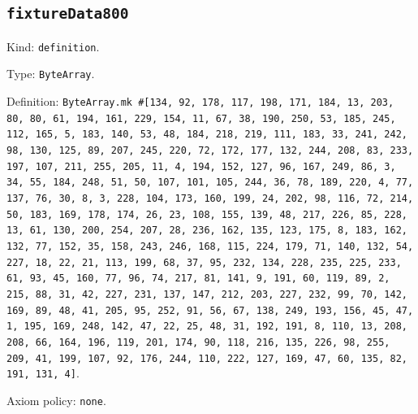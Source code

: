 \documentclass[11pt]{article}
\begin{document}
\subsection*{\texttt{fixtureData800}}
\noindent Kind: \texttt{definition}.\par
\noindent Type: \texttt{ByteArray}.\par
\noindent Definition: \texttt{ByteArray.mk \#[134, 92, 178, 117, 198, 171, 184, 13, 203, 80, 80, 61, 194, 161, 229, 154, 11, 67, 38, 190, 250, 53, 185, 245, 112, 165, 5, 183, 140, 53, 48, 184, 218, 219, 111, 183, 33, 241, 242, 98, 130, 125, 89, 207, 245, 220, 72, 172, 177, 132, 244, 208, 83, 233, 197, 107, 211, 255, 205, 11, 4, 194, 152, 127, 96, 167, 249, 86, 3, 34, 55, 184, 248, 51, 50, 107, 101, 105, 244, 36, 78, 189, 220, 4, 77, 137, 76, 30, 8, 3, 228, 104, 173, 160, 199, 24, 202, 98, 116, 72, 214, 50, 183, 169, 178, 174, 26, 23, 108, 155, 139, 48, 217, 226, 85, 228, 13, 61, 130, 200, 254, 207, 28, 236, 162, 135, 123, 175, 8, 183, 162, 132, 77, 152, 35, 158, 243, 246, 168, 115, 224, 179, 71, 140, 132, 54, 227, 18, 22, 21, 113, 199, 68, 37, 95, 232, 134, 228, 235, 225, 233, 61, 93, 45, 160, 77, 96, 74, 217, 81, 141, 9, 191, 60, 119, 89, 2, 215, 88, 31, 42, 227, 231, 137, 147, 212, 203, 227, 232, 99, 70, 142, 169, 89, 48, 41, 205, 95, 252, 91, 56, 67, 138, 249, 193, 156, 45, 47, 1, 195, 169, 248, 142, 47, 22, 25, 48, 31, 192, 191, 8, 110, 13, 208, 208, 66, 164, 196, 119, 201, 174, 90, 118, 216, 135, 226, 98, 255, 209, 41, 199, 107, 92, 176, 244, 110, 222, 127, 169, 47, 60, 135, 82, 191, 131, 4]}.\par
\noindent Axiom policy: \texttt{none}.\par
\end{document}
